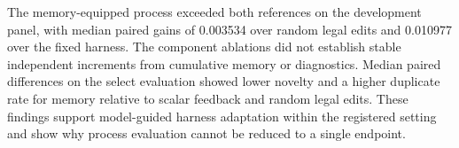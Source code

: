 The memory-equipped process exceeded both references on the development panel, with median paired gains of 0.003534 over random legal edits and 0.010977 over the fixed harness. The component ablations did not establish stable independent increments from cumulative memory or diagnostics. Median paired differences on the select evaluation showed lower novelty and a higher duplicate rate for memory relative to scalar feedback and random legal edits. These findings support model-guided harness adaptation within the registered setting and show why process evaluation cannot be reduced to a single endpoint.

